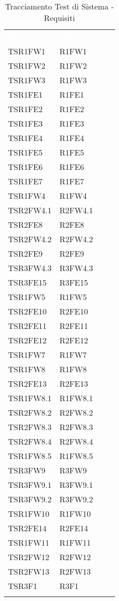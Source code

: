 \renewcommand{\arraystretch}{1.5}
\begin{longtable}{ m{}<{\centering}  m{}<{\centering} }
	\rowcolor{darkblue}
	\textcolor{white}{\textbf{ID Test}} &\textcolor{white}{\textbf{ID Requisito}}\\ 
	 
	TSR1FW1 & R1FW1 \\
	TSR1FW2 &  R1FW2 \\
	TSR1FW3 & R1FW3 \\
	TSR1FE1 & R1FE1 \\
	TSR1FE2 & R1FE2 \\
	TSR1FE3 & R1FE3 \\
	TSR1FE4 & R1FE4 \\
	TSR1FE5 & R1FE5 \\
	TSR1FE6 & R1FE6 \\
	TSR1FE7 & R1FE7 \\
	TSR1FW4 & R1FW4 \\
	TSR2FW4.1 & R2FW4.1 \\
	TSR2FE8 & R2FE8 \\
	TSR2FW4.2 & R2FW4.2 \\
	TSR2FE9 & R2FE9 \\
	TSR3FW4.3 & R3FW4.3\\
	TSR3FE15 & R3FE15 \\
	TSR1FW5 & R1FW5 \\
	TSR2FE10 & R2FE10 \\	 
	TSR2FE11 & R2FE11 \\
	TSR2FE12 & R2FE12 \\
	TSR1FW7 & R1FW7 \\
	TSR1FW8 & R1FW8 \\
	TSR2FE13 & R2FE13 \\
	TSR1FW8.1 & R1FW8.1 \\
	TSR2FW8.2 & R2FW8.2 \\
	TSR2FW8.3 & R2FW8.3 \\
	TSR2FW8.4 & R2FW8.4 \\
	TSR1FW8.5 & R1FW8.5 \\
	TSR3FW9 & R3FW9 \\
	TSR3FW9.1 & R3FW9.1 \\
	TSR3FW9.2 & R3FW9.2 \\
	TSR1FW10 & R1FW10 \\
	TSR2FE14 & R2FE14  \\
	TSR1FW11 & R1FW11 \\
	TSR2FW12 & R2FW12 \\
	TSR2FW13 & R2FW13 \\
	TSR3F1 & R3F1 \\

\caption{Tracciamento Test di Sistema - Requisiti}
\end{longtable}